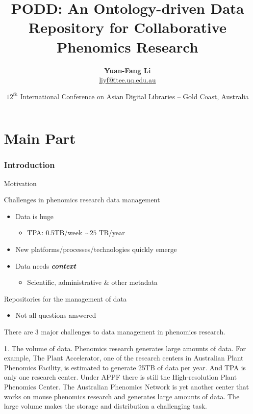 \documentclass[ignorenonframetext,compress]{beamer}
\title[PODD -- An Ontology-driven Repository]{PODD: An Ontology-driven Data Repository for Collaborative Phenomics Research}
\author[Yuan-Fang Li]{
    \textbf{Yuan-Fang Li}\\
    \url{liyf@itee.uq.edu.au}
    }
\institute[UQ]{
    The eResearch Lab, School of ITEE\\The University of Queensland\\
    }
\date[ICADL 2010]{\footnotesize $12^{th}$ International Conference on Asian Digital Libraries -- Gold Coast, Australia}
\begin{document}
\begin{frame}
    \titlepage
\end{frame}

\part{Main Part}

\section{Introduction}
\begin{frame}{Motivation}
\begin{block}{Challenges in phenomics research data management}
    \begin{itemize}
        \item Data is huge
        \begin{itemize}
            \item TPA: 0.5TB/week $\sim 25$ TB/year
        \end{itemize}
        \pause
        \item New platforms/processes/technologies quickly emerge
        \pause
        \item Data needs \textbf{\emph{context}}
        \begin{itemize}
            \item Scientific, administrative \& other metadata
        \end{itemize}
    \end{itemize}
\end{block}
\pause
\begin{block}{Repositories for the management of data}
    \begin{itemize}
      \item Not all questions answered
    \end{itemize}
\end{block}
\end{frame}

There are 3 major challenges to data management in phenomics research.

1. The volume of data. Phenomics research generates large amounts of
data. For example, The Plant Accelerator, one of the research centers
in Australian Plant Phenomics Facility, is
estimated to generate 25TB of data per year. And TPA is only one
research center. Under APPF there is still the High-resolution Plant
Phenomics Center. The Australian Phenomics Network is yet another center
that works on mouse phenomics research and generates large amounts of data.
The large volume makes the storage and distribution a challenging task.
\end{document}
